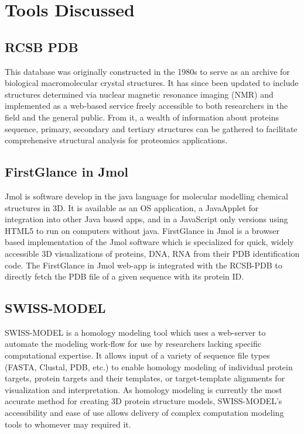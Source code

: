         \subsubsection{}


\section{Tools Discussed}

   \subsection{RCSB PDB}

    This database was originally constructed in the 1980s to serve as an archive for biological macromolecular crystal structures.\autocite{B13} It has since been updated to include structures determined via nuclear magnetic resonance imaging (NMR) and implemented as a web-based service freely accessible to both researchers in the field and the general public.\autocite{B13} From it, a wealth of information about proteins sequence, primary, secondary and tertiary structures can be gathered to facilitate comprehensive structural analysis for proteomics applications.\autocite{B13}

   \subsection{FirstGlance in Jmol}

   Jmol is software develop in the java language for molecular modelling chemical structures in 3D. It is available as an OS application, a JavaApplet for integration into other Java based apps, and in a JavaScript only versions using HTML5 to run on computers without java.\autocite{B14} FirstGlance in Jmol is a browser based implementation of the Jmol software which is specialized for quick, widely accessible 3D visualizations of proteins, DNA, RNA from their PDB identification code.\autocite{B14} The FirstGlance in Jmol web-app is integrated with the RCSB-PDB to directly fetch the PDB file of a given sequence with its protein ID.\autocite{B14}

   \subsection{SWISS-MODEL}

   SWISS-MODEL is a homology modeling tool which uses a web-server to automate the modeling work-flow for use by researchers lacking specific computational expertise.\autocite{B15} It allows input of a variety of sequence file types (FASTA, Clustal, PDB, etc.) to enable homology modeling of individual protein targets, protein targets and their templates, or target-template alignments for visualization and interpretation.\autocite{B15} As homology modeling is currently the most accurate method for creating 3D protein structure models, SWISS-MODEL’s accessibility and ease of use allows delivery of complex computation modeling tools to whomever may required it.


